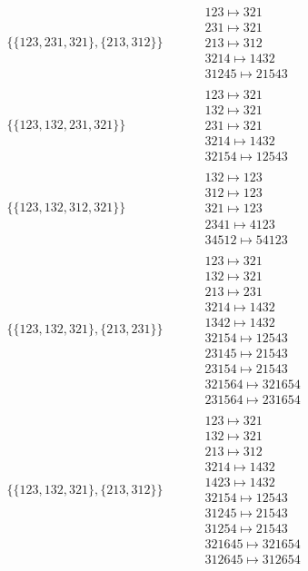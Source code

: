 \begin{tiny}
\begin{align}
\{\{123, 231, 321\}, \{213, 312\}\}
\quad
&
\phantom{.}
&
\begin{matrix}
123 \mapsto 321\\231 \mapsto 321\\213 \mapsto 312\\3214 \mapsto 1432\\31245 \mapsto 21543
\end{matrix}
\\
\{\{123, 132, 231, 321\}\}
\quad
&
\phantom{.}
&
\begin{matrix}
123 \mapsto 321\\132 \mapsto 321\\231 \mapsto 321\\3214 \mapsto 1432\\32154 \mapsto 12543
\end{matrix}
\\
\{\{123, 132, 312, 321\}\}
\quad
&
\phantom{.}
&
\begin{matrix}
132 \mapsto 123\\312 \mapsto 123\\321 \mapsto 123\\2341 \mapsto 4123\\34512 \mapsto 54123
\end{matrix}
\\
\{\{123, 132, 321\}, \{213, 231\}\}
\quad
&
\phantom{.}
&
\begin{matrix}
123 \mapsto 321\\132 \mapsto 321\\213 \mapsto 231\\3214 \mapsto 1432\\1342 \mapsto 1432\\32154 \mapsto 12543\\23145 \mapsto 21543\\23154 \mapsto 21543\\321564 \mapsto 321654\\231564 \mapsto 231654
\end{matrix}
\\
\{\{123, 132, 321\}, \{213, 312\}\}
\quad
&
\phantom{.}
&
\begin{matrix}
123 \mapsto 321\\132 \mapsto 321\\213 \mapsto 312\\3214 \mapsto 1432\\1423 \mapsto 1432\\32154 \mapsto 12543\\31245 \mapsto 21543\\31254 \mapsto 21543\\321645 \mapsto 321654\\312645 \mapsto 312654

\end{matrix}
\end{align}
\end{tiny}
